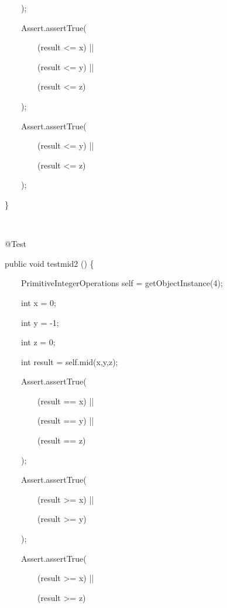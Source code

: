\documentclass{article}
\newenvironment{tmindent}{\begin{tmparmod}{1.5em}{0pt}{0pt} }{\end{tmparmod}}
\newenvironment{tmparmod}[3]{\begin{list}{}{\setlength{\topsep}{0pt}\setlength{\leftmargin}{#1}\setlength{\rightmargin}{#2}\setlength{\parindent}{#3}\setlength{\listparindent}{\parindent}\setlength{\itemindent}{\parindent}\setlength{\parsep}{\parskip}} \item[]}{\end{list}}
\newenvironment{tmparsep}[1]{\begingroup\setlength{\parskip}{#1}}{\endgroup}
\begin{document}
\begin{example}
\begin{tmindent}
\begin{tmparsep}{0em}
      \ \ \ \ \ \ \ );
      
      \ \ \ \ \ \ \ Assert.assertTrue(
      
      \ \ \ \ \ \ \ \ \ \ \ (result <= x) ||
      
      \ \ \ \ \ \ \ \ \ \ \ (result <= y) ||
      
      \ \ \ \ \ \ \ \ \ \ \ (result <= z)
      
      \ \ \ \ \ \ \ );
      
      \ \ \ \ \ \ \ Assert.assertTrue(
      
      \ \ \ \ \ \ \ \ \ \ \ (result <= y) ||
      
      \ \ \ \ \ \ \ \ \ \ \ (result <= z)
      
      \ \ \ \ \ \ \ ); \ \ \
      
      \ \ \ \}
      
      \ \ \
      
      \ \ \ @Test
      
      \ \ \ public void testmid2 () \{
      
      \ \ \ \ \ \ \ PrimitiveIntegerOperations self = getObjectInstance(4);
      
      \ \ \ \ \ \ \ int x = 0;
      
      \ \ \ \ \ \ \ int y = -1;
      
      \ \ \ \ \ \ \ int z = 0;
      
      \ \ \ \ \ \ \ int result = self.mid(x,y,z);
      
      \ \ \ \ \ \ \ Assert.assertTrue(
      
      \ \ \ \ \ \ \ \ \ \ \ (result == x) ||
      
      \ \ \ \ \ \ \ \ \ \ \ (result == y) ||
      
      \ \ \ \ \ \ \ \ \ \ \ (result == z)
      
      \ \ \ \ \ \ \ );
      
      \ \ \ \ \ \ \ Assert.assertTrue(
      
      \ \ \ \ \ \ \ \ \ \ \ (result >= x) ||
      
      \ \ \ \ \ \ \ \ \ \ \ (result >= y)
      
      \ \ \ \ \ \ \ );
      
      \ \ \ \ \ \ \ Assert.assertTrue(
      
      \ \ \ \ \ \ \ \ \ \ \ (result >= x) ||
      
      \ \ \ \ \ \ \ \ \ \ \ (result >= z)
      

\end{tmparsep}
\end{tmindent}
\end{example}
\end{document}

